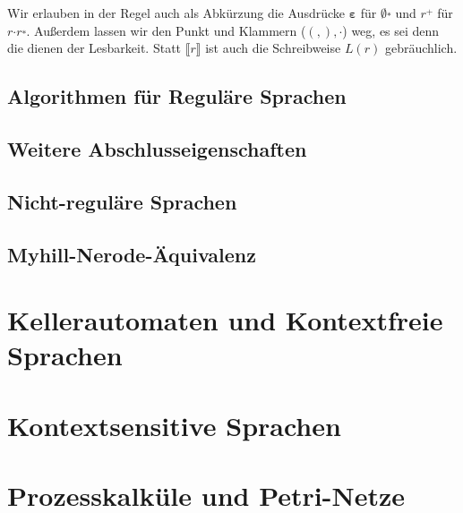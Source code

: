 \documentclass[11pt, a4paper]{article}
\theoremstyle{definition}
\theoremstyle{plain}
\numberwithin{equation}{section}
\begin{document}
Wir erlauben in der Regel auch als Abkürzung die Ausdrücke \( \bm{\varepsilon} \) für \( \bm{\emptyset} \overset{\bm{\ast}}{} \) und \( r \overset{\bm{+}}{} \) für \( r \bm{\cdot} r \overset{\bm{\ast}}{} \). Außerdem lassen wir den Punkt und Klammern (\( (, ), \bm{\cdot} \)) weg, es sei denn die dienen der Lesbarkeit. Statt \( \llbracket r \rrbracket \) ist auch die Schreibweise \( L(r) \) gebräuchlich.



\subsection{Algorithmen für Reguläre Sprachen}\label{sec:regular_algorithms}
\subsection{Weitere Abschlusseigenschaften}\label{sec:regular_closure2}
\subsection{Nicht-reguläre Sprachen}\label{sec:regular_nonregular}
\subsection{Myhill-Nerode-Äquivalenz}\label{sec:regular_myhill-nerode}




\newpage
\section{Kellerautomaten und Kontextfreie Sprachen}\label{sec:contextfree}

\newpage
\section{Kontextsensitive Sprachen}\label{sec:contextsensitive}

\newpage
\section{Prozesskalküle und Petri-Netze}\label{sec:process}

\newpage
{}


\end{document}

